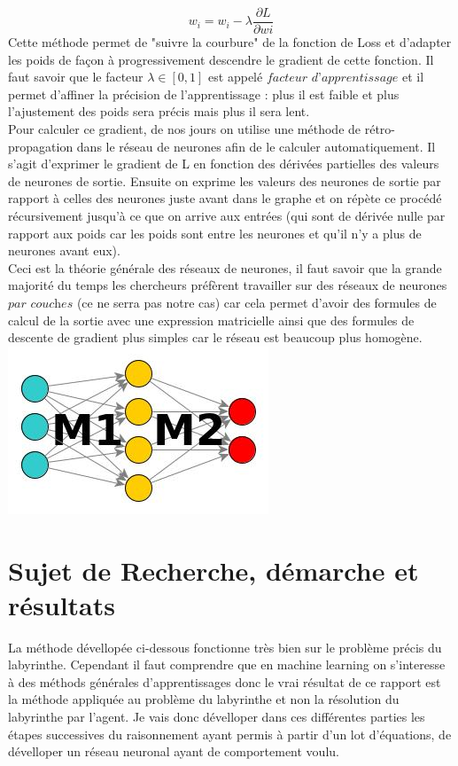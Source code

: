\documentclass[10pt]{article}
\begin{document}
\[w_i = w_i-\lambda\frac{\partial L}{\partial wi}\]
Cette méthode permet de "suivre la courbure" de la fonction de Loss et d'adapter les poids de façon à progressivement descendre le gradient de cette fonction. Il faut savoir que le facteur $\lambda\in[0,1]$ est appelé $\textit{facteur d'apprentissage}$ et il permet d'affiner la précision de l'apprentissage : plus il est faible et plus l'ajustement des poids sera précis mais plus il sera lent.\\
Pour calculer ce gradient, de nos jours on utilise une méthode de rétro-propagation dans le réseau de neurones afin de le calculer automatiquement. Il s'agit d'exprimer le gradient de L en fonction des dérivées partielles des valeurs de neurones de sortie. Ensuite on exprime les valeurs des neurones de sortie par rapport à celles des neurones juste avant dans le graphe et on répète ce procédé récursivement jusqu'à ce que on arrive aux entrées (qui sont de dérivée nulle par rapport aux poids car les poids sont entre les neurones et qu'il n'y a plus de neurones avant eux).\\
Ceci est la théorie générale des réseaux de neurones, il faut savoir que la grande majorité du temps les chercheurs préfèrent travailler sur des réseaux de neurones $\textit{par couches}$ (ce ne serra pas notre cas) car cela permet d'avoir des formules de calcul de la sortie avec une expression matricielle ainsi que des formules de descente de gradient plus simples car le réseau est beaucoup plus homogène.\\
\indent\indent\indent\indent\indent\includegraphics[scale=0.7]{ex_layered_network.jpg}\\

\section{Sujet de Recherche, démarche et résultats}
La méthode dévellopée ci-dessous fonctionne très bien sur le problème précis du labyrinthe. Cependant il faut comprendre que en machine learning on s'interesse à des méthods générales d'apprentissages donc le vrai résultat de ce rapport est la méthode appliquée au problème du labyrinthe et non la résolution du labyrinthe par l'agent. Je vais donc dévelloper dans ces différentes parties les étapes successives du raisonnement ayant permis à partir d'un lot d'équations, de dévelloper un réseau neuronal ayant de comportement voulu.
\end{document}
